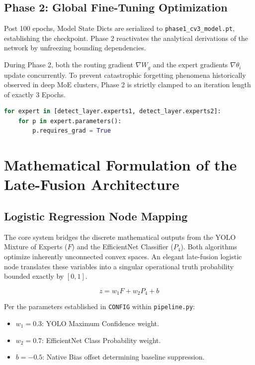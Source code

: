\documentclass[11pt, letterpaper, oneside, openany]{book}
\begin{document}
\section{Phase 2: Global Fine-Tuning Optimization}
Post 100 epochs, Model State Dicts are serialized to \texttt{phase1\_cv3\_model.pt}, establishing the checkpoint. Phase 2 reactivates the analytical derivations of the network by unfreezing bounding dependencies. 

During Phase 2, both the routing gradient $\nabla W_g$ and the expert gradients $\nabla \theta_i$ update concurrently. To prevent catastrophic forgetting phenomena historically observed in deep MoE clusters, Phase 2 is strictly clamped to an iteration length of exactly 3 Epochs.

\begin{lstlisting}[language=Python, caption=Force Unfreezing Phase 2 Parameter Iteration]
for expert in [detect_layer.experts1, detect_layer.experts2]:
    for p in expert.parameters():
        p.requires_grad = True
\end{lstlisting}

\chapter{Mathematical Formulation of the Late-Fusion Architecture}

\section{Logistic Regression Node Mapping}
The core system bridges the discrete mathematical outputs from the YOLO Mixture of Experts ($F$) and the EfficientNet Classifier ($P_4$). Both algorithms optimize inherently unconnected convex spaces. An elegant late-fusion logistic node translates these variables into a singular operational truth probability bounded exactly by $[0, 1]$.

\begin{equation}
    z = w_1 F + w_2 P_4 + b
\end{equation}

Per the parameters established in \texttt{CONFIG} within \texttt{pipeline.py}:
\begin{itemize}
    \item $w_1 = 0.3$: YOLO Maximum Confidence weight.
    \item $w_2 = 0.7$: EfficientNet Class Probability weight.
    \item $b = -0.5$: Native Bias offset determining baseline suppression.
\end{itemize}
\end{document}
